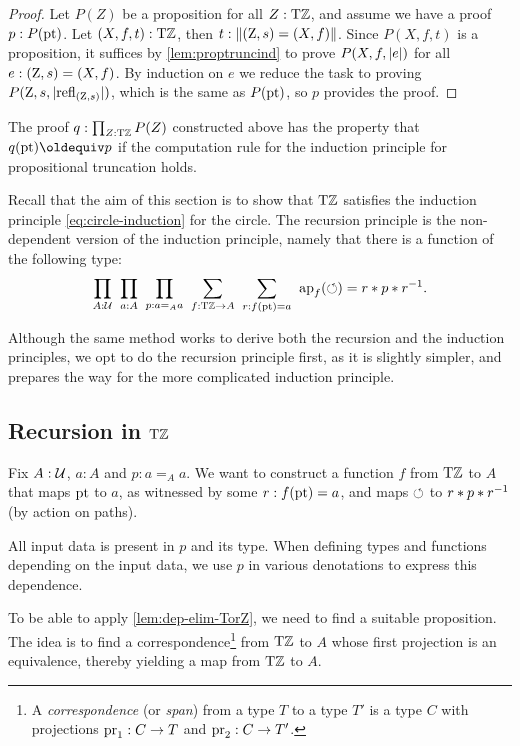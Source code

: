 \documentclass[a4paper,12pt]{amsart}
\begin{document}
\begin{proof}
Let $P(Z)$ be a proposition for all $Z:{\mathrm{T}\mathbb{Z}}$, and assume we have a proof
$p:P({\mathord{\mathrm{pt}}})$. Let $(X,f,t):{\mathrm{T}\mathbb{Z}}$, then $t :\lVert(\mathrm{Z},s)=(X,f)\rVert$.
Since $P(X,f,t)$ is a proposition, it suffices by \cref{lem:proptruncind}
to prove $P(X,f,\lvert e\rvert)$ for all $e:(\mathrm{Z},s)=(X,f)$.
By induction on $e$ we reduce the task to proving $P(\mathrm{Z},s,\lvert\mathop{{\mathrm{refl}}_{(\mathrm{Z},s)}}\rvert)$, which is
the same as $P({\mathord{\mathrm{pt}}})$, so $p$ provides the proof.
\end{proof}

The proof $q: \prod_{Z:{\mathrm{T}\mathbb{Z}}} P(Z)$ constructed above has the property that $q(\pt)\jdeq p$ if the computation rule for the induction principle
for propositional truncation holds.

Recall that the aim of this section is to show that ${\mathrm{T}\mathbb{Z}}$ satisfies the induction principle \cref{eq:circle-induction} for the circle.
The recursion principle is the non-dependent version of the induction principle,
namely that there is a function of the following type:
\begin{equation}
  \label{eq:circle-recursion}
  \thinmuskip=10mu              %
  \prod_{A: \UU}
  \prod_{a: A}
  \prod_{p: a=_A a}
  \sum_{f: \TorZ \to A}
  \sum_{r: f(\pt)= a}
  {\ap{f}(\Zloop) = r\ct p \ct r^{-1}}.
\end{equation}

Although the same method works to derive both the recursion and the induction principles,
we opt to do the recursion principle first, as it is slightly simpler,
and prepares the way for the more complicated induction principle.

\subsection{Recursion in ${\mathrm{T}\mathbb{Z}}$}\label{sec:TorZ-recursion}

Fix $A:\mathcal{U}$, $a:A$ and $p: a=_A a$.
We want to construct a function $f$ from ${\mathrm{T}\mathbb{Z}}$ to $A$
that maps ${\mathord{\mathrm{pt}}}$ to $a$, as witnessed by some $r : f({\mathord{\mathrm{pt}}}) = a$,
and maps ${\circlearrowleft}$ to $r* p* r^{-1}$ (by action on paths).

All input data is present in $p$ and its type.
When defining types and functions depending on the input data,
we use $p$ in various denotations to express this dependence.

To be able to apply \cref{lem:dep-elim-TorZ}, we need to find a suitable proposition.
The idea is to find a correspondence\footnote{%
  A \emph{correspondence} (or \emph{span})
  from a type $T$ to a type $T'$ is a type $C$
  with projections $\operatorname{pr}_1 : C \to T$ and $\operatorname{pr}_2 : C \to T'$.}
from ${\mathrm{T}\mathbb{Z}}$ to $A$ whose first projection is an equivalence, thereby yielding a map from ${\mathrm{T}\mathbb{Z}}$ to $A$.
\end{document}
